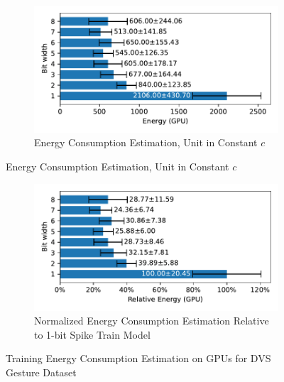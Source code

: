         \begin{figure}[H]
            \centering
            \begin{subfigure}[H]{\textwidth}
                \includegraphics[width=\textwidth]{../standard/DVSGesture/plots/dvsgesture_train_energy_gpu_horizontal.pdf}
                \caption{Energy Consumption Estimation, Unit in Constant $c$}
            \end{subfigure}
        \end{figure}
        \begin{figure}[H]
            \centering
            \ContinuedFloat
            \begin{subfigure}[H]{\textwidth}
                \includegraphics[width=\textwidth]{../standard/DVSGesture/plots/dvsgesture_train_relative_energy_gpu_horizontal.pdf}
                \caption{Normalized Energy Consumption Estimation Relative to 1-bit Spike Train Model}
            \end{subfigure}
            \caption{Training Energy Consumption Estimation on GPUs for DVS Gesture Dataset}
        \end{figure}

    \label{appendix:energy_gpu_cifar10}


